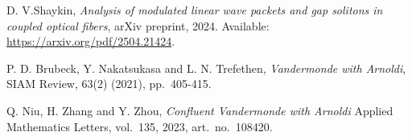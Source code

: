 \documentclass[11pt]{article}
\begin{document}
\begin{thebibliography}{99}
 D. V.Shaykin, \textit{Analysis of modulated linear wave packets and gap solitons in coupled optical fibers}, arXiv 
preprint, 2024. Available: \url{https://arxiv.org/pdf/2504.21424}.

P. D. Brubeck, Y. Nakatsukasa and L. N. Trefethen, 
\textit{Vandermonde with Arnoldi},
SIAM Review, 63(2) (2021), pp.\ 405-415.

Q. Niu, H. Zhang and Y. Zhou,
\textit{Confluent Vandermonde with Arnoldi} 
Applied Mathematics Letters, 
vol.~135, 2023, art.~no.\ 108420.
\end{thebibliography}
\end{document}
